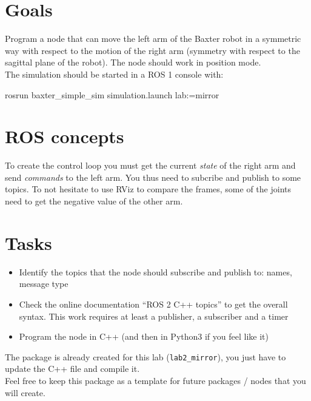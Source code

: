 \documentclass{ecnreport}
\author{O. Kermorgant}
\begin{document}


\section{Goals}

Program a node that can move the left arm of the Baxter robot in a symmetric way with respect to
the motion of the right arm (symmetry with respect to the sagittal plane of the robot).
The node should work in position mode. \\

The simulation should be started in a ROS 1 console with:
\begin{bashcodelarge}
 rosrun baxter_simple_sim simulation.launch lab:=mirror
\end{bashcodelarge}


\section{ROS concepts}

To create the control loop you must get the current \emph{state} of the right arm and send \emph{commands} to 
the left arm. You thus need to subcribe and publish to some topics. To not hesitate to use RViz to compare the frames, some of the joints need to get the negative
value of the other arm.

\section{Tasks}

\begin{itemize}
\item Identify the topics that the node should subscribe and publish to: names, message type
\item Check the online documentation ``ROS 2 C++ topics'' to get the overall syntax. This work requires at least a publisher, a subscriber and a timer
\item Program the node in C++ (and then in Python3 if you feel like it)
\end{itemize}

The package is already created for this lab (\texttt{lab2\_mirror}), you just have to update the C++ file and compile it.\\
Feel free to keep this package as a template for future packages / nodes that you will create.
\end{document}
